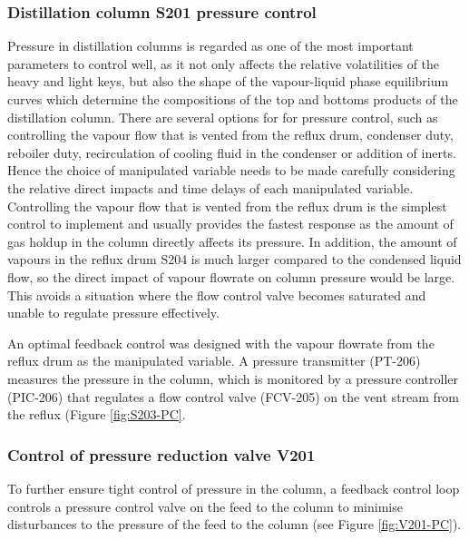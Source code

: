 \subsubsection{Distillation column S201 pressure control} %
Pressure in distillation columns is regarded as one of the most important parameters to control well, as it not only affects the relative volatilities of the heavy and light keys, but also the shape of the vapour-liquid phase equilibrium curves which determine the compositions of the top and bottoms products of the distillation column. There are several options for for pressure control, such as controlling the vapour flow that is vented from the reflux drum, condenser duty, reboiler duty, recirculation of cooling fluid in the condenser or addition of inerts. Hence the choice of manipulated variable needs to be made carefully considering the relative direct impacts and time delays of each manipulated variable. Controlling the vapour flow that is vented from the reflux drum is the simplest control to implement and usually provides the fastest response as the amount of gas holdup in the column directly affects its pressure. In addition, the amount of vapours in the reflux drum S204 is much larger compared to the condensed liquid flow, so the direct impact of vapour flowrate on column pressure would be large. This avoids a situation where the flow control valve becomes saturated and unable to regulate pressure effectively. 

An optimal feedback control was designed with the vapour flowrate from the reflux drum as the manipulated variable. A pressure transmitter (PT-206) measures the pressure in the column, which is monitored by a pressure controller (PIC-206) that regulates a flow control valve (FCV-205) on the vent stream from the reflux (Figure \ref{fig:S203-PC}.



\subsubsection{Control of pressure reduction valve V201} %
To further ensure tight control of pressure in the column, a feedback control loop controls a pressure control valve on the feed to the column to minimise disturbances to the pressure of the feed to the column (see Figure \ref{fig:V201-PC}). %


